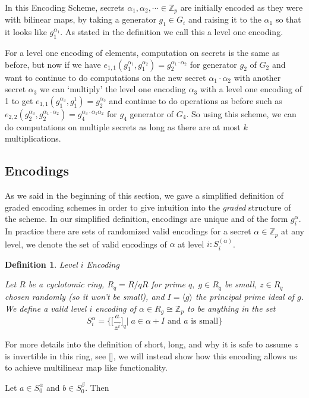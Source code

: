 \documentclass[12pt,twoside]{reedthesis}
\newtheorem{definition}{Definition}
\newcommand{\Z}[0]{\mathbb{Z}}
\begin{document}
    In this Encoding Scheme, secrets $\alpha_1,\alpha_2, \cdots \in \Z_p$ are initially encoded as they were with bilinear maps, by taking a generator $g_1\in G_i$ and raising it to the $\alpha_1$ so that it looks like $g_1^{\alpha_1}$. As stated in the definition we call this a level one encoding.
    \par For a level one encoding of elements, computation on secrets is the same as before, but now if we have $e_{1,1}(g_1^{\alpha_1},g_1^{\alpha_2})=g_2^{\alpha_1\cdot \alpha_2}$ for generator $g_2$ of $G_2$ and want to continue to do computations on the new secret $\alpha_1 \cdot \alpha_2$ with another secret $\alpha_3$ we can `multiply' the level one encoding $\alpha_3$ with a level one encoding of 1 to get $e_{1,1}(g_1^{\alpha_3},g_1^1) = g_2^{\alpha_3}$ and continue to do operations as before such as $e_{2,2}(g_2^{\alpha_3},g_2^{\alpha_1\cdot \alpha_2 }) = g_4^{\alpha_3\cdot \alpha_1 \alpha_2}$ for $g_4$ generator of $G_4$. So using this scheme, we can do computations on multiple secrets as long as there are at most $k$ multiplications.
    
    
    \subsection{Encodings}
    As we said in the beginning of this section, we gave a simplified definition of graded encoding schemes in order to give intuition into the \textit{graded} structure of the scheme. In our simplified definition, encodings are unique and of the form $g_i^\alpha$. In practice there are sets of randomized valid encodings for a secret $\alpha \in \Z_p$ at any level, we denote the set of valid encodings of $\alpha$ at level $i: S_i^{(\alpha)}$.
    
    
    \begin{definition}{Level $i$ Encoding}
    \par Let $R$ be a cyclotomic ring, $R_q = R/qR$ for prime $q, \; g\in R_q$ be small, $z \in R_q$ chosen randomly (so it won't be small), and $I = \langle g\rangle$ the principal prime ideal of $g$. We define a valid level $i$ encoding of $\alpha \in R_g \cong \Z_p$ to be anything in the set
    $$S_i^\alpha =\bigg\{\bigg[\frac{a}{z^i} \bigg]_q \bigg| \; a \in \alpha + I \text{ and $a$ is small}\bigg\}$$
    \end{definition}
    For more details into the definition of short, long, and why it is safe to assume $z$ is invertible in this ring, see [\cite{GGH13}], we will instead show how this encoding allows us to achieve multilinear map like functionality. 
    \par Let $a \in S_0^\alpha$ and $b \in S_0^\beta$. Then 
    
\end{document}
